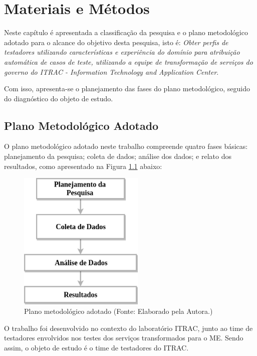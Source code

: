 \chapter{Materiais e Métodos}
\label{ch:metodologia}

Neste capítulo é apresentada a classificação da pesquisa e o plano metodológico adotado para o alcance do objetivo desta pesquisa, isto é: \textit{Obter perfis de testadores utilizando características e experiência do domínio para atribuição automática de casos de teste, utilizando a equipe de transformação de serviços do governo do ITRAC - Information Technology and Application Center}.

Com isso, apresenta-se o planejamento das fases do plano metodológico, seguido do diagnóstico do objeto de estudo.

\section{Plano Metodológico Adotado}
\label{sec:planMetodologico}

O plano metodológico adotado neste trabalho compreende quatro fases básicas: planejamento da pesquisa; coleta de dados; análise dos dados; e relato dos resultados, como apresentado  na Figura \ref{fig:PlanoGeral} abaixo:

        \begin{figure}[H]
          \centering
          \includegraphics[width=6cm]{figuras/planoGeral.png}
          \caption{Plano metodológico adotado (Fonte: Elaborado pela Autora.)} 
          \label{fig:PlanoGeral}
        
        \end{figure}

O trabalho foi desenvolvido no contexto do laboratório ITRAC, junto ao time de testadores envolvidos nos testes dos serviços transformados para o ME. Sendo assim, o objeto de estudo é o time de testadores do ITRAC.

